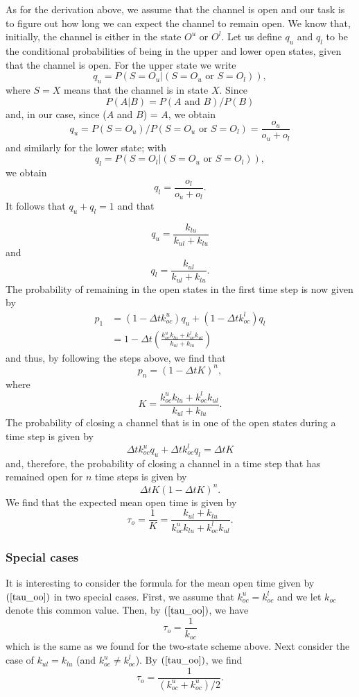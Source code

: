 As for the derivation above, we assume that the channel is open and
our task is to figure out how long we can expect the channel to remain open. We
know that, initially, the channel is either in the state $O^{u}$ or
$O^{l}$. Let us define $q_u$ and $q_l$ to be the conditional 
probabilities of being in the upper and lower open states, given that the channel is open. For the upper state we write
\[ q_u = P(S=O_u | (S={O_u} \mbox{\ or\ } S={O_l})), \]
where $S=X$ means that the channel is in state $X$.
Since
\[ P(A|B) = P(A \mbox{\ and\ } B)/P(B) \]
 and, in our case, since ($A$ and $B$) = $A$, we obtain
\[ q_u = P(S=O_u)/P(S={O_u} \mbox{\ or\ } S={O_l}) = \frac{o_u}{o_u+o_l} \]
and similarly for the lower state; with
\[ q_l = P(S=O_l | (S={O_u} \mbox{\ or\ } S={O_l})), \]
we obtain
\[ q_l  = \frac{o_l}{o_u+o_l}.\]
It follows that $q_u + q_l = 1$ and that

\[
q_{u}=\frac{k_{lu}}{k_{ul}+k_{lu}}
\]
and
\[
q_{l}=\frac{k_{ul}}{k_{ul}+k_{lu}}.
\]
The probability of remaining in the open states in the first time step is now given
by
\begin{align*}
p_{1}  & =\left(  1-\Delta tk_{oc}^{u}\right)  q_{u}+\left(  1-\Delta
tk_{oc}^{l}\right)  q_{l}\\
& =1-\Delta t\left(  \frac{k_{oc}^{u}k_{lu}+k_{oc}^{l}k_{ul}}{k_{ul}+k_{lu}
}\right)  
\end{align*}
and thus, by following the steps above, we find that
\[
p_{n}=\left(  1-\Delta tK\right)  ^{n},
\]
where
\[
K=\frac{k_{oc}^{u}k_{lu}+k_{oc}^{l}k_{ul}}{k_{ul}+k_{lu}}.
\]
The probability of closing a channel that is in one of the open states during
a time step is given by
\[
\Delta tk_{oc}^{u}q_{u}+\Delta tk_{oc}^{l}q_{l}=\Delta tK
\]
and, therefore, the probability of closing a channel in a time step that has
remained open for $n$ time steps is given by
\[
\Delta tK\left(  1-\Delta tK\right)^{n}.
\]
We find  that the expected mean open time is given by
\begin{equation}
\tau_{o}=\frac{1}{K}=\frac{k_{ul}+k_{lu}}{k_{oc}^{u}k_{lu}+k_{oc}^{l}k_{ul}}. \label{tau_oo}
\end{equation}

\subsubsection{Special cases}

It is interesting to consider the formula  for the mean open time given 
by $(\ref{tau_oo})$ in two special cases. First, we assume that 
$k^u_{oc}=k^l_{oc}$  and we let $k_{oc}$ denote this common value. Then, by $(\ref{tau_oo})$, we have 
\begin{equation*}
\tau_{o}=\frac{1}{k_{oc}}
\end{equation*}
which is the same as we found for the two-state scheme above. Next consider the case of $k_{ul}=k_{lu}$  (and 
$k^u_{oc}\not=k^l_{oc}$). By $(\ref{tau_oo})$, we find 
\begin{equation}
\tau_{o}=\frac{1}{(k_{oc}^{u}+k_{oc}^{u})/2}. \label{tau_ooo}
\end{equation}


